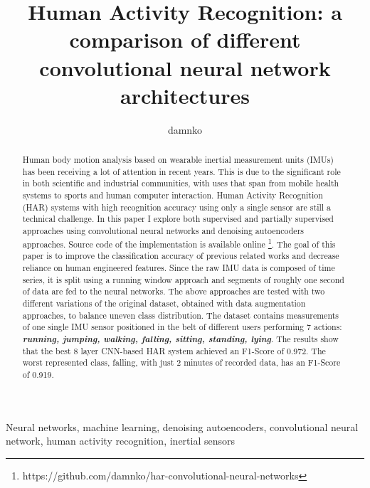 \documentclass[10pt, conference, letterpaper]{IEEEtran}
\title{Human Activity Recognition: a comparison of different convolutional neural network architectures}
\author{damnko}
\begin{document}
\maketitle

\begin{abstract}
Human body motion analysis based on wearable inertial measurement units (IMUs) has been receiving a lot of attention in recent years. This is due to the significant role in both scientific and industrial communities, with uses that span from mobile health systems to sports and human computer interaction. Human Activity Recognition (HAR) systems with high recognition accuracy using only a single sensor are still a technical challenge. In this paper I explore both supervised and partially supervised approaches using convolutional neural networks and denoising autoencoders approaches. Source code of the implementation is available online \footnote{https://github.com/damnko/har-convolutional-neural-networks}. The goal of this paper is to improve the classification accuracy of previous related works and decrease reliance on human engineered features. Since the raw IMU data is composed of time series, it is split using a running window approach and segments of roughly one second of data are fed to the neural networks. The above approaches are tested with two different variations of the original dataset, obtained with data augmentation approaches, to balance uneven class distribution. The dataset contains measurements of one single IMU sensor positioned in the belt of different users performing 7 actions: \textit{\textbf{running, jumping, walking, falling, sitting, standing, lying}}. The results show that the best 8 layer \mbox{CNN-based} HAR system achieved an \mbox{F1-Score} of 0.972. The worst represented class, falling, with just 2 minutes of recorded data, has an F1-Score of 0.919.
\end{abstract}

\IEEEkeywords
Neural networks, machine learning, denoising autoencoders, convolutional neural network, human activity recognition, inertial sensors
\endIEEEkeywords














\end{document}

